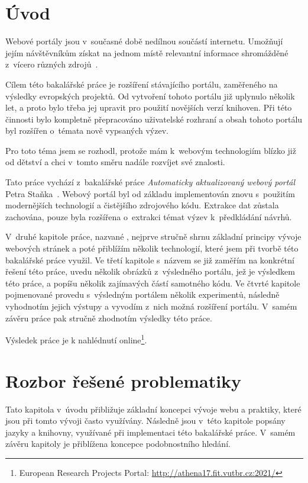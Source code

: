 \chapter{Úvod}
Webové portály jsou v~současné době nedílnou součástí internetu. Umožňují jejím návštěvníkům získat na jednom místě relevantní informace shromážděné z~vícero různých zdrojů~\cite{bib:portal-liferay}.

Cílem této bakalářské práce je rozšíření stávajícího portálu, zaměřeného na výsledky evropských projektů. Od vytvoření tohoto portálu již uplynulo několik let, a proto bylo třeba jej upravit pro použití novějších verzí knihoven. Při této činnosti bylo kompletně přepracováno uživatelské rozhraní a obsah tohoto portálu byl rozšířen o~témata nově vypsaných výzev.

Pro toto téma jsem se rozhodl, protože mám k~webovým technologiím blízko již od dětství a chci v~tomto směru nadále rozvíjet své znalosti.

Tato práce vychází z~bakalářské práce \emph{Automaticky aktualizovaný webový portál} Petra Staňka~\cite{bib:stanek}.
Webový portál byl od základu implementován znovu s~použitím modernějších technologií a čistějšího zdrojového kódu. Extrakce dat zůstala zachována, pouze byla rozšířena o~extrakci témat výzev k~předkládání návrhů.

V~druhé kapitole práce, nazvané , nejprve stručně shrnu základní principy vývoje webových stránek a poté přiblížím několik technologií, které jsem při tvorbě této bakalářské práce využil.
Ve třetí kapitole s~názvem  se již zaměřím na konkrétní řešení této práce, uvedu několik obrázků z~výsledného portálu, jež je výsledkem této práce, a popíšu několik zajímavých částí samotného kódu.
Ve čtvrté kapitole pojmenované  provedu s~výsledným portálem několik experimentů, následně vyhodnotím jejich výstupy a vyvodím z~nich možná rozšíření portálu.
V~samém závěru práce pak stručně zhodnotím výsledky této práce.

Výsledek práce je k nahlédnutí online\footnote{European Research Projects Portal: \url{http://athena17.fit.vutbr.cz:2021/}}.




\chapter{Rozbor řešené problematiky}
Tato kapitola v~úvodu přibližuje základní koncepci vývoje webu a praktiky, které jsou při tomto vývoji často využívány. Následně jsou v~této kapitole popsány jazyky a knihovny, využívané při implementaci této bakalářské práce. V~samém závěru kapitoly je přiblížena koncepce podobnostního hledání.



